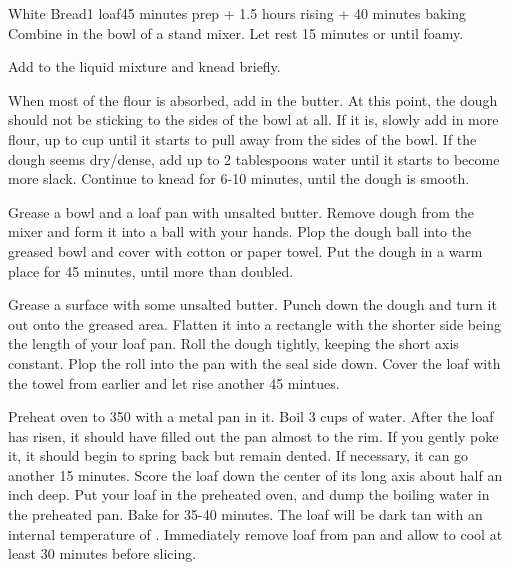 \documentclass[../Cookbook.tex]{subfiles}
\begin{document}
\begin{recipe}[WhiteBread]{White Bread}{1 loaf}{45 minutes prep + 1.5 hours rising + 40 minutes baking}
Combine in the bowl of a stand mixer. Let rest 15 minutes or until foamy.

Add to the liquid mixture and knead briefly.

When most of the flour is absorbed, add in the butter.
At this point, the dough should not be sticking to the sides of the bowl at all.
If it is, slowly add in more flour, up to  cup until it starts to pull away from the sides of the bowl.
If the dough seems dry/dense, add up to 2 tablespoons water until it starts to become more slack.
Continue to knead for 6-10 minutes, until the dough is smooth.

Grease a bowl and a loaf pan with unsalted butter.
Remove dough from the mixer and form it into a ball with your hands.
Plop the dough ball into the greased bowl and cover with cotton or paper towel.
Put the dough in a warm place for 45 minutes, until more than doubled.

Grease a surface with some unsalted butter.
Punch down the dough and turn it out onto the greased area.
Flatten it into a rectangle with the shorter side being the length of your loaf pan.
Roll the dough tightly, keeping the short axis constant.
Plop the roll into the pan with the seal side down.
Cover the loaf with the towel from earlier and let rise another 45 mintues.

Preheat oven to 350 with a metal pan in it.
Boil 3 cups of water.
After the loaf has risen, it should have filled out the pan almost to the rim.
If you gently poke it, it should begin to spring back but remain dented.
If necessary, it can go another 15 minutes.
Score the loaf down the center of its long axis about half an inch deep.
Put your loaf in the preheated oven, and dump the boiling water in the preheated pan.
Bake for 35-40 minutes.
The loaf will be dark tan with an internal temperature of .
Immediately remove loaf from pan and allow to cool at least 30 minutes before slicing.

\end{recipe}
\end{document}
